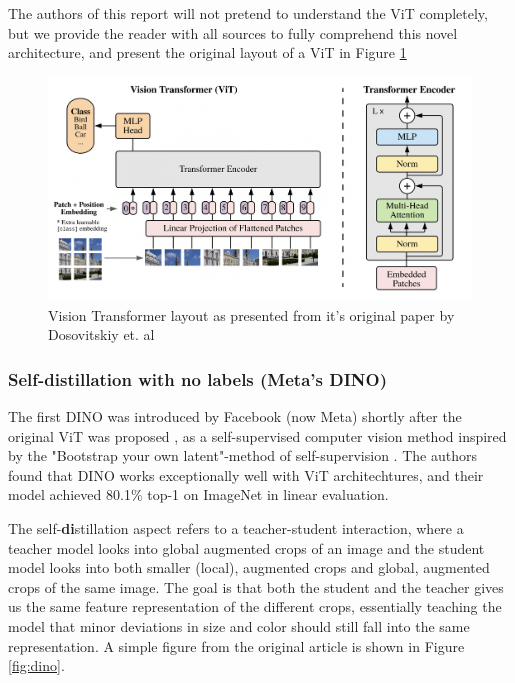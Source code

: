 The authors of this 
report will not pretend to understand the ViT completely, but we provide the reader with all sources
to fully comprehend this novel architecture, and present the original layout of a ViT in Figure \ref{fig:ViT}

\begin{figure}[H]
    \centering
    \includegraphics[width=1.1\linewidth]{examples/tests_eb/figs/vit.png}
    \caption{Vision Transformer layout as presented from it's original paper by Dosovitskiy et. al \cite{first_vit}}
    \label{fig:ViT}
\end{figure}

\subsubsection{Self-\textbf{di}stillation with \textbf{no} labels (Meta's \textbf{DINO})} \label{sssec:dino}
The first DINO was introduced by Facebook (now Meta) shortly after the original ViT was proposed \cite{dino1}, as a self-supervised computer vision method inspired by the "Bootstrap your own latent"-method of self-supervision \cite{byol}. The authors found that DINO works exceptionally well with ViT architechtures, and their model achieved 80.1\% top-1 on ImageNet in linear evaluation.  

The self-\textbf{di}stillation aspect refers to a teacher-student interaction, where a teacher model looks into global augmented crops of an image and the student model looks into both smaller (local), augmented crops and global, augmented crops of the same image. The goal is that both the student and the teacher gives us the same feature representation of the different crops, essentially teaching the model that minor deviations in size and color should still fall into the same representation. A simple figure from the original article is shown in Figure \ref{fig:dino}.

